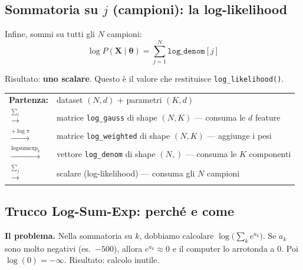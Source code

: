 \documentclass[11pt,a4paper]{article}
\begin{document}
\subsection{Sommatoria su $j$ (campioni): la log-likelihood}

Infine, sommi su tutti gli $N$ campioni:
\begin{equation}
    \log P(\mathbf{X}\mid\boldsymbol{\theta}) = \sum_{j=1}^{N} \texttt{log\_denom}[j]
    \label{eq:ll}
\end{equation}

Risultato: \textbf{uno scalare}. Questo \`e il valore che restituisce \texttt{log\_likelihood()}.

\begin{infobox}
\begin{center}
\begin{tabular}{ll}
\textbf{Partenza:} & dataset $(N, d)$ + parametri $(K, d)$ \\
$\xrightarrow{\sum_l}$ & matrice \texttt{log\_gauss} di shape $(N, K)$ --- consuma le $d$ feature \\
$\xrightarrow{+\log\pi}$ & matrice \texttt{log\_weighted} di shape $(N, K)$ --- aggiunge i pesi \\
$\xrightarrow{\text{logsumexp}_k}$ & vettore \texttt{log\_denom} di shape $(N,)$ --- consuma le $K$ componenti \\
$\xrightarrow{\sum_j}$ & scalare (log-likelihood) --- consuma gli $N$ campioni \\
\end{tabular}
\end{center}
\end{infobox}

\subsection{Trucco Log-Sum-Exp: perch\'e e come}

\textbf{Il problema.} Nella sommatoria su $k$, dobbiamo calcolare $\log\!\bigl(\sum_k e^{a_k}\bigr)$. Se $a_k$ sono molto negativi (es.\ $-500$), allora $e^{a_k} \approx 0$ e il computer lo arrotonda a $0$. Poi $\log(0) = -\infty$. Risultato: calcolo inutile.
\end{document}
